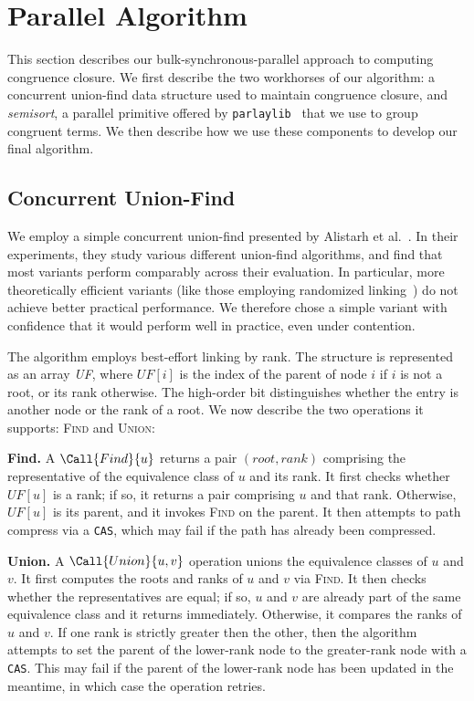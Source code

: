 \section{Parallel Algorithm}
\label{sec:alg}

This section describes our bulk-synchronous-parallel approach to computing
congruence closure. We first describe the two workhorses of our algorithm: a
concurrent union-find data structure used to maintain congruence closure, and
\textit{semisort}, a parallel primitive offered by
\texttt{parlaylib}~\cite{parlaylib} that we use to group congruent terms. We
then describe how we use these components to develop our final algorithm.

\subsection{Concurrent Union-Find}
\label{subsec:uf}

We employ a simple concurrent union-find presented by Alistarh et al.~\cite{uf}.
In their experiments, they study various different union-find algorithms, and
find that most variants perform comparably across their evaluation. In
particular, more theoretically efficient variants (like those employing
randomized linking~\cite{jayanti16}) do not achieve better practical
performance. We therefore chose a simple variant with confidence that it would
perform well in practice, even under contention.

The algorithm employs best-effort linking by rank. The structure is represented
as an array \textit{UF}, where $\mathit{UF}[i]$ is the index of the parent of
node $i$ if $i$ is not a root, or its rank otherwise. The high-order bit
distinguishes whether the entry is another node or the rank of a root. We now
describe the two operations it supports: \textsc{Find} and \textsc{Union}:

\textbf{Find.} A $\Call{Find}{u}$ returns a pair $(\mathit{root},
\mathit{rank})$ comprising the representative of the equivalence class of $u$
and its rank. It first checks whether $\mathit{UF}[u]$ is a rank; if so, it
returns a pair comprising $u$ and that rank. Otherwise, $\mathit{UF}[u]$ is its
parent, and it invokes \textsc{Find} on the parent. It then attempts to path
compress via a \texttt{CAS}, which may fail if the path has already been
compressed.

\textbf{Union.} A $\Call{Union}{u, v}$ operation unions the equivalence classes
of $u$ and $v$. It first computes the roots and ranks of $u$ and $v$ via
\textsc{Find}. It then checks whether the representatives are equal; if so, $u$
and $v$ are already part of the same equivalence class and it returns
immediately. Otherwise, it compares the ranks of $u$ and $v$. If one rank is
strictly greater then the other, then the algorithm attempts to set the parent
of the lower-rank node to the greater-rank node with a \texttt{CAS}. This may
fail if the parent of the lower-rank node has been updated in the meantime, in
which case the operation retries.

